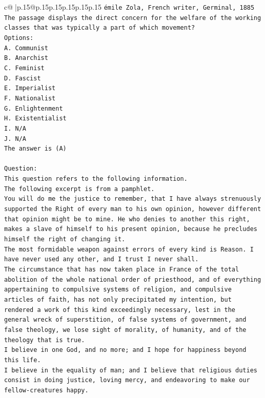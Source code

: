 \documentclass{article}
\begin{document}
{\begin{supertabular}{c@{$\;$}|p{.15\linewidth}@{}p{.15\linewidth}p{.15\linewidth}p{.15\linewidth}p{.15\linewidth}p{.15\linewidth}}
{{{\texttt{émile Zola, French writer, Germinal, 1885} \\
\texttt{The passage displays the direct concern for the welfare of the working classes that was typically a part of which movement?} \\
\texttt{Options:} \\
\texttt{A. Communist} \\
\texttt{B. Anarchist} \\
\texttt{C. Feminist} \\
\texttt{D. Fascist} \\
\texttt{E. Imperialist} \\
\texttt{F. Nationalist} \\
\texttt{G. Enlightenment} \\
\texttt{H. Existentialist} \\
\texttt{I. N/A} \\
\texttt{J. N/A} \\
\texttt{The answer is (A)} \\
\\ 
\texttt{Question:} \\
\texttt{This question refers to the following information.} \\
\texttt{The following excerpt is from a pamphlet.} \\
\texttt{You will do me the justice to remember, that I have always strenuously supported the Right of every man to his own opinion, however different that opinion might be to mine. He who denies to another this right, makes a slave of himself to his present opinion, because he precludes himself the right of changing it.} \\
\texttt{The most formidable weapon against errors of every kind is Reason. I have never used any other, and I trust I never shall.} \\
\texttt{The circumstance that has now taken place in France of the total abolition of the whole national order of priesthood, and of everything appertaining to compulsive systems of religion, and compulsive articles of faith, has not only precipitated my intention, but rendered a work of this kind exceedingly necessary, lest in the general wreck of superstition, of false systems of government, and false theology, we lose sight of morality, of humanity, and of the theology that is true.} \\
\texttt{I believe in one God, and no more; and I hope for happiness beyond this life.} \\
\texttt{I believe in the equality of man; and I believe that religious duties consist in doing justice, loving mercy, and endeavoring to make our fellow{-}creatures happy.} \\
}}}
\end{supertabular}}
\end{document}
